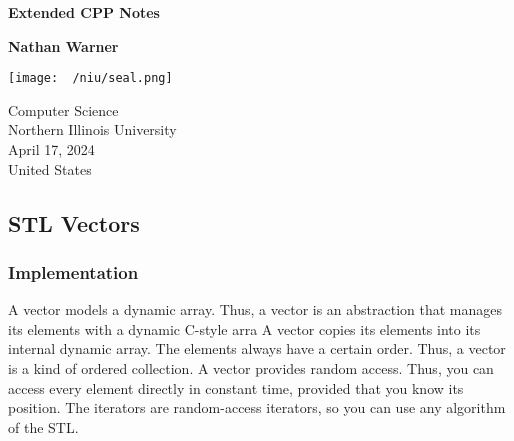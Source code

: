\documentclass{report}
\title{\Huge{}}
\author{\huge{Nathan Warner}}
\date{\huge{}}
\begin{document}
        \begin{titlepage}
       \begin{center}
           \vspace*{1cm}
    
           \textbf{Extended CPP Notes}
    
           \vspace{0.5cm}
            
                
           \vspace{1.5cm}
    
           \textbf{Nathan Warner}
    
           \vfill
                
                
           \vspace{0.8cm}
         
           \texttt{[image: ~/niu/seal.png]}
                
           Computer Science \\
           Northern Illinois University\\
           April 17, 2024 \\
           United States\\
           
                
       \end{center}
    \end{titlepage}
    \tableofcontents
   \pagebreak 
   \subsection{STL Vectors}
   \bigbreak \noindent 
   \subsubsection{Implementation}
   \bigbreak \noindent 
   A vector models a dynamic array. Thus, a vector is an abstraction that manages its elements with a dynamic C-style arra
   \bigbreak \noindent 
   A vector copies its elements into its internal dynamic array. The elements always have a certain order. Thus, a vector is a kind of ordered collection. A vector provides random access. Thus, you can access every element directly in constant time, provided that you know its position. The iterators are random-access iterators, so you can use any algorithm of the STL.
\end{document}
